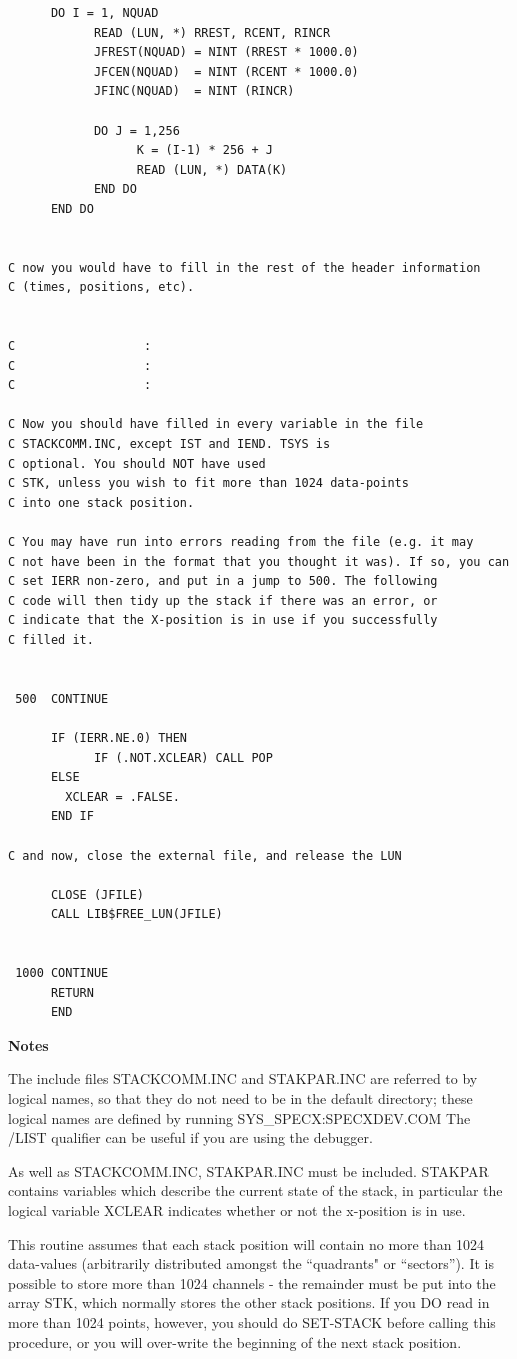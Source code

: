 \documentclass[11pt,twoside]{report}
\begin{document}
\begin{verbatim}
      DO I = 1, NQUAD
            READ (LUN, *) RREST, RCENT, RINCR
            JFREST(NQUAD) = NINT (RREST * 1000.0)
            JFCEN(NQUAD)  = NINT (RCENT * 1000.0)
            JFINC(NQUAD)  = NINT (RINCR)

            DO J = 1,256
                  K = (I-1) * 256 + J
                  READ (LUN, *) DATA(K)
            END DO
      END DO


C now you would have to fill in the rest of the header information
C (times, positions, etc).


C                  :
C                  :
C                  :

C Now you should have filled in every variable in the file
C STACKCOMM.INC, except IST and IEND. TSYS is
C optional. You should NOT have used
C STK, unless you wish to fit more than 1024 data-points
C into one stack position.

C You may have run into errors reading from the file (e.g. it may
C not have been in the format that you thought it was). If so, you can
C set IERR non-zero, and put in a jump to 500. The following
C code will then tidy up the stack if there was an error, or
C indicate that the X-position is in use if you successfully
C filled it.


 500  CONTINUE

      IF (IERR.NE.0) THEN
            IF (.NOT.XCLEAR) CALL POP
      ELSE
        XCLEAR = .FALSE.
      END IF

C and now, close the external file, and release the LUN

      CLOSE (JFILE)
      CALL LIB$FREE_LUN(JFILE)


 1000 CONTINUE
      RETURN
      END
\end{verbatim}

{\Large{\bf Notes}}

The include files STACKCOMM.INC and STAKPAR.INC are referred to by
logical names, so that they do not need to be in the default
directory; these logical names are defined by running
SYS\_SPECX:SPECXDEV.COM The /LIST qualifier can be useful if you are
using the debugger.

As well as STACKCOMM.INC, STAKPAR.INC must be included. STAKPAR
contains variables which describe the current state of the stack, in
particular the logical variable XCLEAR indicates whether or not the
x-position is in use.

This routine assumes that each stack position will contain no more than 1024
data-values (arbitrarily distributed amongst the ``quadrants" or ``sectors'').
It is possible to store more than 1024 channels - the remainder must be put
into the array STK, which normally stores the other stack positions. If you DO
read in more than 1024 points, however, you should do SET-STACK before calling
this procedure, or you will over-write the beginning of the next stack
position.
\end{document}

